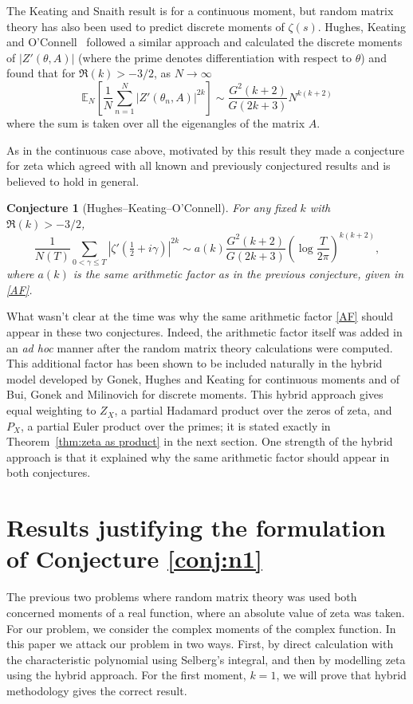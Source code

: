 \documentclass[12pt,a4paper,reqno]{amsart}
\newtheorem{conjecture}[theorem]{Conjecture}
\theoremstyle{remark}
\numberwithin{equation}{section}
\begin{document}
The Keating and Snaith result is for a continuous moment, but random matrix theory has also been used to predict discrete moments of $\zeta (s)$. Hughes, Keating and O'Connell~\cite{HKO00} followed a similar approach and calculated the discrete moments of $|Z'(\theta,A)|$ (where the prime denotes differentiation with respect to $\theta$) and found that for $\Re(k)>-3/2$, as $N\to\infty$
\begin{equation}\label{eq:HKOresult}
\mathbb{E}_N \left[ \frac{1}{N} \sum_{n=1}^N |Z'(\theta_n,A)|^{2k} \right] \sim \frac{G^2 (k+2)}{G(2k+3)} N^{k(k+2)}
\end{equation}
where the sum is taken over all the eigenangles of the matrix $A$.

As in the continuous case above, motivated by this result they made a conjecture for zeta which agreed with all known and previously conjectured results and is believed to hold in general.
\begin{conjecture}[Hughes--Keating--O'Connell]
For any fixed $k$ with $\Re (k) > -3/2$,
\begin{equation*}
    \frac{1}{N(T)} \sum_{0 < \gamma \leq T} \left| \zeta' \left( \tfrac{1}{2} + i \gamma \right) \right| ^{2k} \sim a(k) \frac{G^2 (k+2)}{G(2k+3)} \left( \log \frac{T}{2\pi} \right)^{k(k+2)},
\end{equation*}
where $a(k)$ is the same arithmetic factor as in the previous conjecture, given in \eqref{AF}.
\end{conjecture}


What wasn't clear at the time was why the same arithmetic factor \eqref{AF} should appear in these two conjectures. Indeed, the arithmetic factor itself was added in an \textit{ad hoc} manner after the random matrix theory calculations were computed. This additional factor has been shown to be included naturally in the hybrid model developed by Gonek, Hughes and Keating \cite{GHK07} for continuous moments and of Bui, Gonek and Milinovich \cite{BGM13} for discrete moments. This hybrid approach gives equal weighting to $Z_X$, a partial Hadamard product over the zeros of zeta, and $P_X$, a partial Euler product over the primes; it is stated exactly in Theorem~\ref{thm:zeta as product} in the next  section. One strength of the hybrid approach is that it explained why the same arithmetic factor should appear in both conjectures.


\section{Results justifying the formulation of Conjecture \ref{conj:n1}}\label{sect:RMTresults}
The previous two problems where random matrix theory was used both concerned moments of a real function, where an absolute value of zeta was taken. For our problem, we consider the complex moments of the complex function. In this paper we attack our problem in two ways. First, by direct calculation with the characteristic polynomial using Selberg's integral, and then by modelling zeta using the hybrid approach. For the first moment, $k=1$, we will prove that hybrid methodology gives the correct result. 
\end{document}

